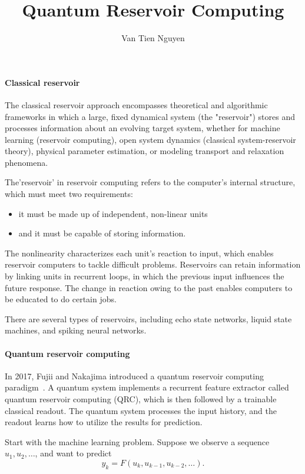 \documentclass[10pt,article]{IEEEtran}
\title{Quantum Reservoir Computing}
\author{Van Tien Nguyen}
\begin{document}
\maketitle

\paragraph{Classical reservoir}
The classical reservoir approach encompasses theoretical and algorithmic frameworks in which a large, fixed dynamical system (the "reservoir") stores and processes information about an evolving target system, whether for machine learning (reservoir computing), open system dynamics (classical system-reservoir theory), physical parameter estimation, or modeling transport and relaxation phenomena.

The'reservoir' in reservoir computing refers to the computer's internal structure, which must meet two requirements: 
\begin{itemize}
    \item it must be made up of independent, non-linear units
    \item and it must be capable of storing information.
\end{itemize}
The nonlinearity characterizes each unit's reaction to input, which enables reservoir computers to tackle difficult problems. Reservoirs can retain information by linking units in recurrent loops, in which the previous input influences the future response. The change in reaction owing to the past enables computers to be educated to do certain jobs.

There are several types of reservoirs, including echo state networks, liquid state machines, and spiking neural networks.

\paragraph{Quantum reservoir computing}
In 2017, Fujii and Nakajima introduced a quantum reservoir computing paradigm~\cite{fujii2017harnessing}. A quantum system implements a recurrent feature extractor called quantum reservoir computing (QRC), which is then followed by a trainable classical readout. The quantum system processes the input history, and the readout learns how to utilize the results for prediction.

Start with the machine learning problem. Suppose we observe a sequence \(u_1,u_2,\ldots\), and want to predict
\begin{equation}
    y_k=F(u_k,u_{k-1},u_{k-2},\ldots).
\end{equation}
\end{document}
